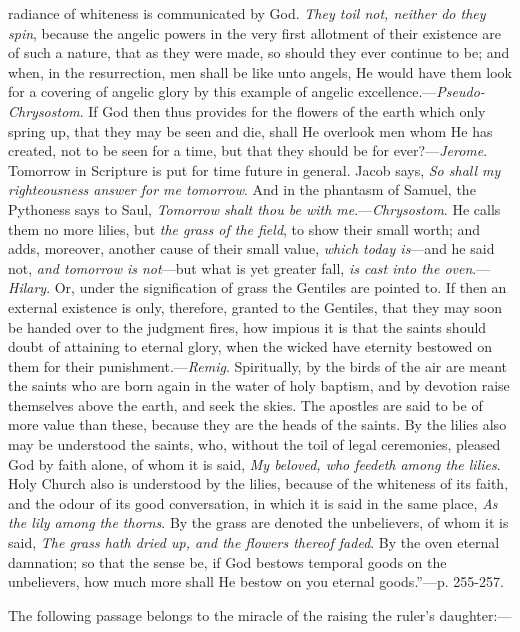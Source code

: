 radiance of whiteness is communicated by God. \emph{They toil not, neither
do they spin}, because the angelic powers in the very first allotment
of their existence are of such a nature, that as they were made, so
should they ever continue to be; and when, in the resurrection, men
shall be like unto angels, He would have them look for a covering of
angelic glory by this example of angelic excellence.—\emph{Pseudo-
Chrysostom}. If God then thus provides for the flowers of the earth
which only spring up, that they may be seen and die, shall He overlook
men whom He has created, not to be seen for a time, but that they should
be for ever?—\emph{Jerome}. Tomorrow in Scripture is put for time
future in general. Jacob says, \emph{So shall my righteousness answer for
me tomorrow}. And in the phantasm of Samuel, the Pythoness says to
Saul, \emph{Tomorrow shalt thou be with me}.—\emph{Chrysostom}. He
calls them no more lilies, but \emph{the grass of the field}, to show
their small worth; and adds, moreover, another cause of their small
value, \emph{which today is}—and he said not, \emph{and tomorrow is not}—but
what is yet greater fall, \emph{is cast into the oven}.—\emph{Hilary}.
Or, under the signification of grass the Gentiles are pointed to. If
then an external existence is only, therefore, granted to the Gentiles,
that they may soon be handed over to the judgment fires, how impious it
is that the saints should doubt of attaining to eternal glory, when the
wicked have eternity bestowed on them for their punishment.—\emph{Remig}.
Spiritually, by the birds of the air are meant the saints who are born
again in the water of holy baptism, and by devotion raise themselves
above the earth, and seek the skies. The apostles are said to be of more
value than these, because they are the heads of the saints. By the
lilies also may be understood the saints, who, without the toil of legal
ceremonies, pleased God by faith alone, of whom it is said, \emph{My
beloved, who feedeth among the lilies}. Holy Church also is
understood by the lilies, because of the whiteness of its faith, and the
odour of its good conversation, in which it is said in the same place, \emph{As
the lily among the thorns}. By the grass are denoted the unbelievers,
of whom it is said, \emph{The grass hath dried up, and the flowers thereof
faded}. By the oven eternal damnation; so that the sense be, if God
bestows temporal goods on the unbelievers,
how much more shall He bestow on you eternal goods.''—p. 255-257.

The following passage belongs to the miracle of the
raising the ruler's daughter:—


